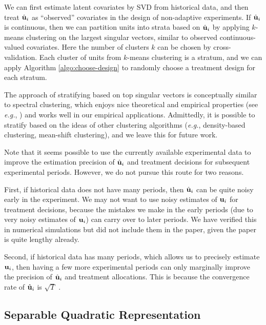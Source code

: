 {We can first estimate latent covariates by SVD from historical data, and then treat $\hat{\mathbf{u}}_i$ as ``observed'' covariates in the design of non-adaptive experiments. If $\hat{\mathbf{u}}_i$ is continuous, then we can partition units into strata based on $\hat{\mathbf{u}}_i$ by applying $k$-means clustering on the largest singular vectors, similar to observed continuous-valued covariates. Here the number of clusters $k$ can be chosen by cross-validation. Each cluster of units from $k$-means clustering is a stratum, and we can apply Algorithm \ref{algo:choose-design} to randomly choose a treatment design for each stratum. 

The approach of stratifying based on top singular vectors is conceptually similar to spectral clustering, which enjoys nice theoretical and empirical properties (see {\it e.g.}, \cite{ng2001spectral}) and works well in our empirical applications. Admittedly, it is possible to stratify based on the ideas of other clustering algorithms ({\it e.g.}, density-based clustering, mean-shift clustering), and we leave this for future work. 


Note that it seems possible to use the currently available experimental data to improve the estimation precision of $\hat{\mathbf{u}}_i$ and treatment decisions for subsequent experimental periods. However, we do not pursue this route for two reasons.

First, if historical data does not have many periods, then $\hat{\mathbf{u}}_i$ can be quite noisy early in the experiment. We may not want to use noisy estimates of $\mathbf{u}_i$ for treatment decisions, because the mistakes we make in the early periods (due to very noisy estimates of $\mathbf{u}_i$) can carry over to later periods. We have verified this in numerical simulations but did not include them in the paper, given the paper is quite lengthy already.

Second, if historical data has many periods, which allows us to precisely estimate $\mathbf{u}_i$, then having a few more experimental periods can only marginally improve the precision of $\hat{\mathbf{u}}_i$ and treatment allocations. This is because the convergence rate of $\hat{\mathbf{u}}_i$ is $\sqrt{T}$ \citep{bai2003inferential}.





    \subsection{Separable Quadratic Representation}\label{subsec:separate-quadratic}
    
}
